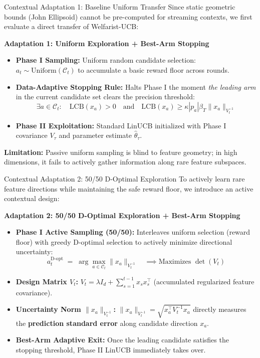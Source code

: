 \documentclass[11pt]{beamer}
\newcommand{\LCB}{\mathrm{LCB}}
\begin{document}
\begin{frame}{Contextual Adaptation 1: Baseline Uniform Transfer}
  \small
  Since static geometric bounds (John Ellipsoid) cannot be pre-computed for streaming contexts, we first evaluate a direct transfer of Welfarist-UCB:

  \vspace{4pt}
  \textbf{Adaptation 1: Uniform Exploration + Best-Arm Stopping}
  \begin{itemize}
      \item \textbf{Phase I Sampling:} Uniform random candidate selection: $a_t \sim \text{Uniform}(\mathcal{C}_t)$ to accumulate a basic reward floor across rounds.
      \item \textbf{Data-Adaptive Stopping Rule:} Halts Phase I the moment \emph{the leading arm} in the current candidate set clears the precision threshold:
      \[
        \exists a \in \mathcal{C}_t : \quad \LCB(x_a) > 0 \quad \text{and} \quad \LCB(x_a) \ge \kappa |p_a| \beta_T \|x_a\|_{V_t^{-1}}
      \]
      \item \textbf{Phase II Exploitation:} Standard LinUCB initialized with Phase I covariance $V_\tau$ and parameter estimate $\hat{\theta}_\tau$.
  \end{itemize}

  \vspace{3pt}
  \textbf{Limitation:} Passive uniform sampling is blind to feature geometry; in high dimensions, it fails to actively gather information along rare feature subspaces.
\end{frame}

\begin{frame}{Contextual Adaptation 2: 50/50 D-Optimal Exploration}
  \small
  To actively learn rare feature directions while maintaining the safe reward floor, we introduce an active contextual design:

  \vspace{2pt}
  \textbf{Adaptation 2: 50/50 D-Optimal Exploration + Best-Arm Stopping}
  \begin{itemize}
      \item \textbf{Phase I Active Sampling (50/50):} Interleaves uniform selection (reward floor) with greedy D-optimal selection to actively minimize directional uncertainty:
      \[
        a_t^{\text{D-opt}} \;=\; \arg\max_{a \in \mathcal{C}_t} \|x_a\|_{V_t^{-1}} \quad \implies \text{Maximizes } \det(V_t)
      \]
      \item \textbf{Design Matrix $V_t$:} $V_t = \lambda I_d + \sum_{s=1}^{t-1} x_s x_s^\top$ (accumulated regularized feature covariance).
      \item \textbf{Uncertainty Norm $\|x_a\|_{V_t^{-1}}$:} $\|x_a\|_{V_t^{-1}} = \sqrt{x_a^\top V_t^{-1} x_a}$ directly measures the \textbf{prediction standard error} along candidate direction $x_a$.
      \item \textbf{Best-Arm Adaptive Exit:} Once the leading candidate satisfies the stopping threshold, Phase II LinUCB immediately takes over.
  \end{itemize}
\end{frame}
\end{document}

